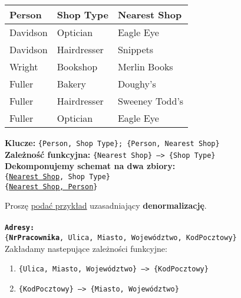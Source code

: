 \begin{center}
    \begin{tabular}{|l|l|l|}
        \hline
        \textbf{Person} &
        \textbf{Shop Type} &
        \textbf{Nearest Shop}\\
        \hline
        Davidson & Optician & Eagle Eye \\
        \hline
        Davidson & Hairdresser & Snippets \\
        \hline
        Wright & Bookshop & Merlin Books \\
        \hline
        Fuller & Bakery & Doughy's \\
        \hline
        Fuller & Hairdresser & Sweeney Todd's \\
        \hline
        Fuller & Optician & Eagle Eye \\
        \hline
    \end{tabular}
\end{center}

\vskip 0.5cm

\textbf{Klucze:} \texttt{\{Person, Shop Type\}; \{Person, Nearest Shop\}}\\
\textbf{Zależność funkcyjna:} \texttt{\{Nearest Shop\} --> \{Shop Type\}}\\

\textbf{Dekomponujemy schemat na dwa zbiory:}\\
\texttt{\{\underline{Nearest Shop}, Shop Type\}}\\
\texttt{\{\underline{Nearest Shop, Person}\}}\\

\pagebreak

\horrule{0.5pt}
Proszę \underline{podać przykład} uzasadniający \textbf{denormalizację}.\\
\horrule{0.5pt}\\

\texttt{\textbf{Adresy:}\\
\{\textbf{{\color{green}\faKey}NrPracownika}, Ulica, Miasto,
Województwo, KodPocztowy\}}\\

Zakładamy nastepujące zależności funkcyjne:
\begin{enumerate}
    \item \texttt{\{Ulica, Miasto, Województwo\} --> \{KodPocztowy\}}
    \item \texttt{\{KodPocztowy\} --> \{Miasto, Województwo\}}
\end{enumerate}

